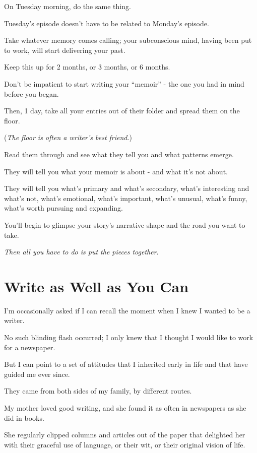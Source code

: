 \documentclass{book}
\numberwithin{equation}{section}
\begin{document}
On Tuesday morning, do the same thing.

Tuesday's episode doesn't have to be related to Monday's episode.

Take whatever memory comes calling; your subconscious mind, having been put to work, will start delivering your past.

Keep this up for 2 months, or 3 months, or 6 months.

Don't be impatient to start writing your ``memoir'' - the one you had in mind before you began.

Then, 1 day, take all your entries out of their folder and spread them on the floor.

(\textit{The floor is often a writer's best friend}.)

Read them through and see what they tell you and what patterns emerge.

They will tell you what your memoir is about - and what it's not about.

They will tell you what's primary and what's secondary, what's interesting and what's not, what's emotional, what's important, what's unusual, what's funny, what's worth pursuing and expanding.

You'll begin to glimpse your story's narrative shape and the road you want to take.

%
\textit{Then all you have to do is put the pieces together}.


\chapter{Write as Well as You Can}

I'm occasionally asked if I can recall the moment when I knew I wanted to be a writer.

No such blinding flash occurred; I only knew that I thought I would like to work for a newspaper.

But I can point to a set of attitudes that I inherited early in life and that have guided me ever since.

They came from both sides of my family, by different routes.

%
My mother loved good writing, and she found it as often in newspapers as she did in books.

She regularly clipped columns and articles out of the paper that delighted her with their graceful use of language, or their wit, or their original vision of life.
\end{document}
